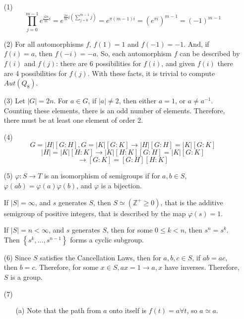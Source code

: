 %
%
\begin{itemize}
\item[(1)]
$$\prod_{j = 0}^{m-1} e^{\frac{j2\pi}{m}i} = e^{\frac{2\pi}{m}i\left(\sum_{j=0}^{m-1}j\right)} = e^{\pi(m-1)i} = (e^{\pi i})^{m-1} = (-1)^{m-1}$$
\item[(2)]
For all automorphisms $f$, $f(1) = 1$ and $f(-1) = -1$. And, if $f(i) = a$, then $f(-i) = -a$. So, each automorphism $f$ can be described by $f(i)$ and $f(j)$: there are 6 possibilities for $f(i)$, and given $f(i)$ there are 4 possibilities for $f(j)$. With these facts, it is trivial to compute $Aut(Q_8)$.
\item[(3)]
Let $|G| = 2n$. For $a \in G$, if $|a| \neq 2$, then either $a = 1$, or $a \neq a^{-1}$. Counting these elements, there is an odd number of elements. Therefore, there must be at least one element of order 2.
\item[(4)]
$$G = |H|[G : H], G = |K|[G : K] \rightarrow |H|[G : H] = |K|[G : K]$$
$$|H| = |K|[H : K] \rightarrow |K|[H : K][G : H] = |K|[G : K]$$
$$\rightarrow [G : K] = [G : H][H : K]$$
\item[(5)]
$\varphi: S \rightarrow T$ is an isomorphism of semigroups if for $a, b \in S$, $\varphi(ab) = \varphi(a)\varphi(b)$, and $\varphi$ is a bijection.

If $|S| = \infty$, and $s$ generates $S$, then $S \simeq (\mathbb{Z}^+ \geq 0)$, that is the additive semigroup of positive integers, that is described by the map $\varphi(s) = 1$.

If $|S| = n < \infty$, and $s$ generates $S$, then for some $0 \leq k < n$, then $s^n = s^k$. Then $\left\lbrace s^k, ..., s^{n-1} \right\rbrace$ forms a cyclic subgroup.
\item[(6)]
Since $S$ satisfies the Cancellation Laws, then for $a, b, c \in S$, if $ab = ac$, then $b = c$. Therefore, for some $x \in S, ax = 1 \rightarrow a, x$ have inverses. Therefore, $S$ is a group.
\item[(7)]
\begin{itemize}
\item[(a)]
Note that the path from $a$ onto itself is $f(t) = a \forall t$, so $a \simeq a$.


\end{itemize}
\end{itemize}
